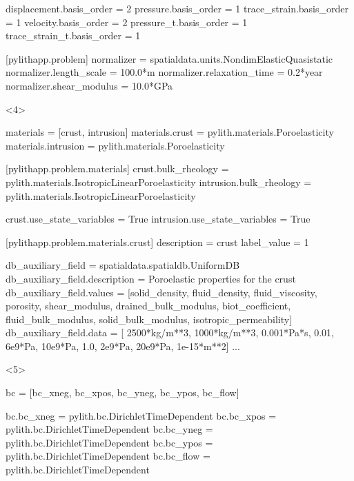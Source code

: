 \documentclass[aspectratio=169]{beamer}
\begin{document}
\begin{frame}[t,fragile]
\begin{minipage}[t]{0.67\textwidth}
\begin{onlyenv}
\begin{cfgcode}
        displacement.basis_order = 2
        pressure.basis_order = 1
        trace_strain.basis_order = 1
        velocity.basis_order = 2
        pressure_t.basis_order = 1
        trace_strain_t.basis_order = 1        

        [pylithapp.problem]
        normalizer = spatialdata.units.NondimElasticQuasistatic
        normalizer.length_scale = 100.0*m
        normalizer.relaxation_time = 0.2*year
        normalizer.shear_modulus = 10.0*GPa
      \end{cfgcode}
    \end{onlyenv}
    \begin{onlyenv}<4>
      \begin{cfgcode}
        materials = [crust, intrusion]
        materials.crust = pylith.materials.Poroelasticity
        materials.intrusion = pylith.materials.Poroelasticity

        [pylithapp.problem.materials]
        crust.bulk_rheology = pylith.materials.IsotropicLinearPoroelasticity
        intrusion.bulk_rheology = pylith.materials.IsotropicLinearPoroelasticity

        crust.use_state_variables = True
        intrusion.use_state_variables = True

        [pylithapp.problem.materials.crust]
        description = crust
        label_value = 1

        db_auxiliary_field = spatialdata.spatialdb.UniformDB
        db_auxiliary_field.description = Poroelastic properties for the crust
        db_auxiliary_field.values = [solid_density, fluid_density, fluid_viscosity, porosity, shear_modulus, drained_bulk_modulus, biot_coefficient, fluid_bulk_modulus, solid_bulk_modulus, isotropic_permeability]
        db_auxiliary_field.data   = [ 2500*kg/m**3,  1000*kg/m**3,      0.001*Pa*s,     0.01,        6e9*Pa,              10e9*Pa,              1.0,             2e9*Pa,            20e9*Pa,             1e-15*m**2]
        ...
      \end{cfgcode}
    \end{onlyenv}
    \begin{onlyenv}<5>
      \begin{cfgcode}
        bc = [bc_xneg, bc_xpos, bc_yneg, bc_ypos, bc_flow]

        bc.bc_xneg = pylith.bc.DirichletTimeDependent
        bc.bc_xpos = pylith.bc.DirichletTimeDependent
        bc.bc_yneg = pylith.bc.DirichletTimeDependent
        bc.bc_ypos = pylith.bc.DirichletTimeDependent
        bc.bc_flow = pylith.bc.DirichletTimeDependent


\end{cfgcode}
\end{onlyenv}
\end{minipage}
\end{frame}
\end{document}
